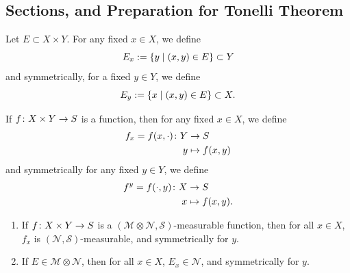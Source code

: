 \documentclass[11pt,leqno,oneside]{amsbook}
\numberwithin{thm}{section}
\newcommand{\M}{\mathcal{M}} %
\newcommand{\cN}{\mathcal{N}}
\newcommand{\cS}{\mathcal{S}}
\newcommand{\x}{\times}
\newcommand{\ox}{\otimes}
\begin{document}
\subsection*{Sections, and Preparation for Tonelli Theorem}
\begin{defn}
  Let $E \subset X \x Y$.  For any fixed $x \in X$, we define $$E_x := \{y \mid (x,y) \in E\} \subset Y$$ and symmetrically, for a fixed $y \in Y$, we define $$E_y := \{x \mid (x,y) \in E\} \subset X.$$
\end{defn}
\begin{defn}
  If $f \from X \x Y \to S$ is a function, then for any fixed $x \in X$, we define
  \begin{align*}
    f_x = f(x, \cdot) \colon Y &\to S \\
    y &\mapsto f(x,y)
  \end{align*}
  and symmetrically for any fixed $y \in Y$, we define
  \begin{align*}
    f^y = f(\cdot, y) \colon X &\to S \\
    x &\mapsto f(x,y).
  \end{align*}
\end{defn}
\begin{prop}
  \mbox{}
  \begin{enumerate}[label=(\arabic{*})]
    \item If $f \from X \x Y \to S$ is a $(\M \ox \cN, \cS)$-measurable function, then for all $x \in X$, $f_x$ is $(\cN, \cS)$-measurable, and symmetrically for $y$.
    \item If $E \in \M \ox \cN$, then for all $x \in X$, $E_x \in \cN$, and symmetrically for $y$.
  \end{enumerate}
\end{prop}
\end{document}
